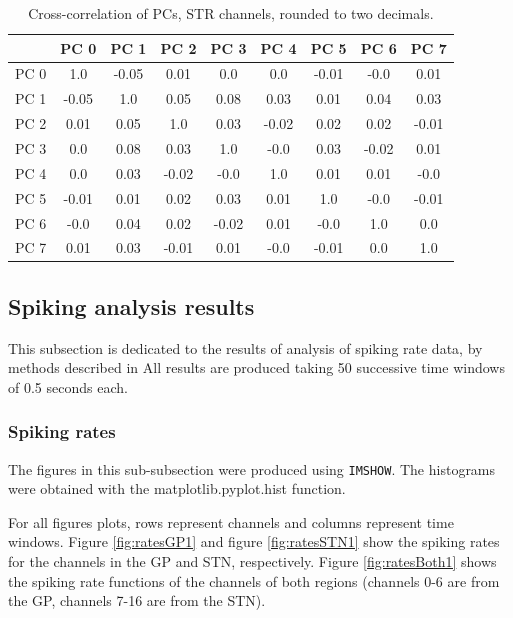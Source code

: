 \documentclass{article}
\begin{document}
\begin{table}[H]
    \centering
    \begin{tabular}{|c|c|c|c|c|c|c|c|c|}
    \hline
          & PC 0  &  PC 1 &  PC 2 &  PC 3 &  PC 4 &  PC 5 &  PC 6 &  PC 7 \\ \hline
     PC 0 &  1.0  & -0.05 &  0.01 &  0.0  &  0.0  & -0.01 & -0.0  &  0.01 \\ \hline
     PC 1 & -0.05 &  1.0  &  0.05 &  0.08 &  0.03 &  0.01 &  0.04 &  0.03 \\ \hline
     PC 2 &  0.01 &  0.05 &  1.0  &  0.03 & -0.02 &  0.02 &  0.02 & -0.01 \\ \hline
     PC 3 &  0.0  &  0.08 &  0.03 &  1.0  & -0.0  &  0.03 & -0.02 &  0.01 \\ \hline
     PC 4 &  0.0  &  0.03 & -0.02 & -0.0  &  1.0  &  0.01 &  0.01 & -0.0  \\ \hline
     PC 5 & -0.01 &  0.01 &  0.02 &  0.03 &  0.01 &  1.0 &  -0.0  & -0.01 \\ \hline
     PC 6 & -0.0  &  0.04 &  0.02 & -0.02 &  0.01 & -0.0 &   1.0  &  0.0  \\ \hline
     PC 7 &  0.01 &  0.03 & -0.01 &  0.01 & -0.0  & -0.01 &  0.0  &  1.0  \\ \hline
    \end{tabular}
    \caption{Cross-correlation of PCs, STR channels, rounded to two decimals.}
    \label{tab:corrcoefSTR}
\end{table}

\subsection{Spiking analysis results}

This subsection is dedicated to the results of analysis of spiking rate data, by methods described in 
All results are produced taking 50 successive time windows of 0.5 seconds each.

\subsubsection{Spiking rates}

The figures in this sub-subsection were produced using \texttt{IMSHOW}.
The histograms were obtained with the {matplotlib.pyplot.hist} function.

For all figures plots, rows represent channels and columns represent time windows. 
Figure \ref{fig:ratesGP1} and figure \ref{fig:ratesSTN1} show the spiking rates for the channels in the GP and STN, respectively.
Figure \ref{fig:ratesBoth1} shows the spiking rate functions of the channels of both regions (channels 0-6 are from the GP, channels 7-16 are from the STN).
\end{document}
